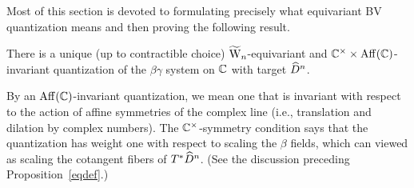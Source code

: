Most of this section is devoted to formulating precisely what equivariant BV quantization means and then proving the following result.

\begin{thm} 
\label{bvq} 
There is a unique (up to contractible choice) $\widetilde{{{\rm W}}}_n$-equivariant and $\mathbb C^\times \times {\rm Aff}(\mathbb C)$-invariant quantization 
of the $\beta\gamma$ system on $\mathbb C$ with target $\widehat{D}^n$.
\end{thm}

By an ${\rm Aff}(\mathbb C)$-invariant quantization, we mean one that is invariant with respect to the action of affine symmetries of the complex line (i.e., translation and dilation by complex numbers). 
The $\mathbb C^\times$-symmetry condition says that the quantization has weight one with respect to scaling the $\beta$ fields, which can viewed as scaling the cotangent fibers of $T^*\widehat{D}^n$.
(See the discussion preceding Proposition~\ref{eqdef}.)

